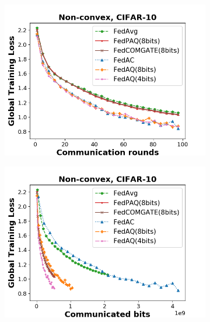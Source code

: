 \begin{figure}[hbt!]%
    \centering
    \begin{subfigure}[b]{0.31\textwidth}
    \includegraphics[width=\textwidth]{figure/loss_iid_comm_cnn_step100.png}
    \end{subfigure}
    \begin{subfigure}[b]{0.31\textwidth}
    \includegraphics[width=\textwidth]{figure/loss_iid_bits_cnn_step100.png}
    \end{subfigure}
    \begin{subfigure}[b]{0.31\textwidth}

\end{subfigure}
\end{figure}
